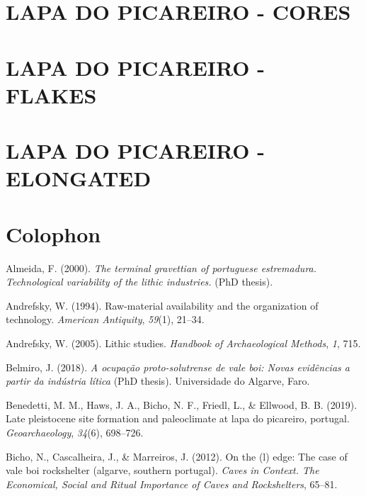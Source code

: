 \documentclass[12pt,twoside]{reedthesis}
\begin{document}
\hypertarget{lapa-do-picareiro---cores}{%
\section{LAPA DO PICAREIRO - CORES}\label{lapa-do-picareiro---cores}}

\hypertarget{lapa-do-picareiro---flakes}{%
\section{LAPA DO PICAREIRO - FLAKES}\label{lapa-do-picareiro---flakes}}

\hypertarget{lapa-do-picareiro---elongated}{%
\section{LAPA DO PICAREIRO - ELONGATED}\label{lapa-do-picareiro---elongated}}

\hypertarget{colophon}{%
\section{Colophon}\label{colophon}}

\hypertarget{refs}{}
\leavevmode\hypertarget{ref-almeida2000}{}%
Almeida, F. (2000). \emph{The terminal gravettian of portuguese estremadura. Technological variability of the lithic industries.} (PhD thesis).

\leavevmode\hypertarget{ref-andrefsky1994}{}%
Andrefsky, W. (1994). Raw-material availability and the organization of technology. \emph{American Antiquity}, \emph{59}(1), 21--34.

\leavevmode\hypertarget{ref-andrefsky2005}{}%
Andrefsky, W. (2005). Lithic studies. \emph{Handbook of Archaeological Methods}, \emph{1}, 715.

\leavevmode\hypertarget{ref-belmiro2018}{}%
Belmiro, J. (2018). \emph{A ocupação proto-solutrense de vale boi: Novas evidências a partir da indústria lítica} (PhD thesis). Universidade do Algarve, Faro.

\leavevmode\hypertarget{ref-benedettietal2019}{}%
Benedetti, M. M., Haws, J. A., Bicho, N. F., Friedl, L., \& Ellwood, B. B. (2019). Late pleistocene site formation and paleoclimate at lapa do picareiro, portugal. \emph{Geoarchaeology}, \emph{34}(6), 698--726.

\leavevmode\hypertarget{ref-bichoetal2012}{}%
Bicho, N., Cascalheira, J., \& Marreiros, J. (2012). On the (l) edge: The case of vale boi rockshelter (algarve, southern portugal). \emph{Caves in Context. The Economical, Social and Ritual Importance of Caves and Rockshelters}, 65--81.
\end{document}
